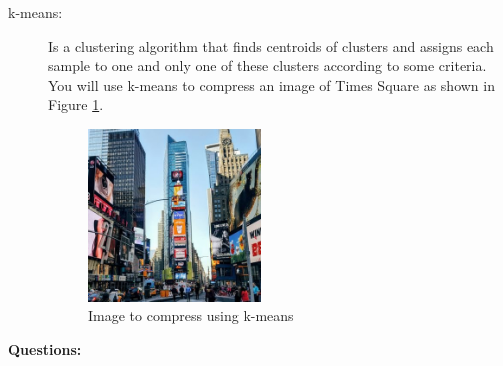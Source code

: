 \documentclass[11pt]{article}
\begin{document}
\begin{description}


  \item[k-means: ] Is a clustering algorithm that finds centroids of clusters and assigns each sample to one and only one of these clusters according to some criteria. You will use k-means to compress an image of Times Square as shown in Figure \ref{fig:times}.

\begin{figure}[H]
  \centering
  \includegraphics[width=0.45\textwidth]{tsq.jpg}
  \caption{Image to compress using k-means}
  \label{fig:times}
\end{figure}

\end{description}
\newpage
\textbf{Questions:}
\end{document}
